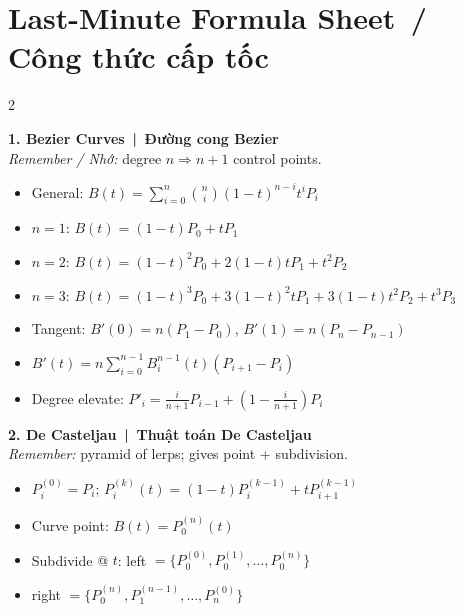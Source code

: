 
\section*{Last-Minute Formula Sheet \,/\, Công thức cấp tốc}
\scriptsize
\setlength{\columnsep}{8pt}
\setlength{\abovedisplayskip}{1pt}
\setlength{\belowdisplayskip}{1pt}
\setlength{\abovedisplayshortskip}{1pt}
\setlength{\belowdisplayshortskip}{1pt}

\begin{multicols}{2}

\textbf{1. Bezier Curves \,|\, Đường cong Bezier}\\
\emph{Remember / Nhớ:} degree $n \Rightarrow n{+}1$ control points.
\begin{itemize}
\item General: $B(t)=\sum_{i=0}^{n}\binom{n}{i}(1-t)^{n-i}t^{i}P_i$
\item $n{=}1$: $B(t)=(1-t)P_0+tP_1$
\item $n{=}2$: $B(t)=(1-t)^2P_0+2(1-t)tP_1+t^2P_2$
\item $n{=}3$: $B(t)=(1-t)^3P_0+3(1-t)^2tP_1+3(1-t)t^2P_2+t^3P_3$
\item Tangent: $B'(0)=n(P_1-P_0)$,\; $B'(1)=n(P_n-P_{n-1})$
\item $B'(t)=n\sum_{i=0}^{n-1}B_i^{n-1}(t)(P_{i+1}-P_i)$
\item Degree elevate: $P'_i=\tfrac{i}{n+1}P_{i-1}+(1-\tfrac{i}{n+1})P_i$
\end{itemize}

\textbf{2. De Casteljau \,|\, Thuật toán De Casteljau}\\
\emph{Remember:} pyramid of lerps; gives point + subdivision.
\begin{itemize}
\item $P_i^{(0)}=P_i$;\; $P_i^{(k)}(t)=(1-t)P_i^{(k-1)}+tP_{i+1}^{(k-1)}$
\item Curve point: $B(t)=P_0^{(n)}(t)$
\item Subdivide @ $t$: left $=\{P_0^{(0)},P_0^{(1)},\dots,P_0^{(n)}\}$
\item \phantom{Subdivide @ $t$:} right $=\{P_0^{(n)},P_1^{(n-1)},\dots,P_n^{(0)}\}$
\end{itemize}


\end{multicols}

